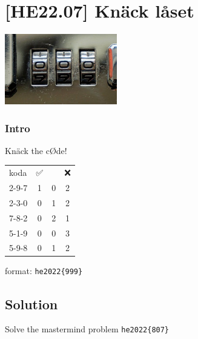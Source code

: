 
\hypertarget{he22.07}{%
\chapter{[HE22.07] Knäck låset}\label{he22.07}}

\begin{marginfigure}
	\includegraphics[width=49mm]{level3/challenge7.jpg}
\end{marginfigure}
\subsection{Intro}
Knäck the cØde!

\begin{tabular}{lccc}
	koda  & {\NotoEmoji ✅} &{\NotoEmoji 🔀}& {\NotoEmoji ❌} \\  
2-9-7  &1  &0  &2    \\
2-3-0  &0  &1  &2    \\
7-8-2  &0  &2  &1    \\
5-1-9  &0  &0 & 3    \\
5-9-8  &0  &1 & 2    \\
\end{tabular}

 format: \verb+he2022{999}+

\section{Solution}\label{hv21.07-solution}

Solve the mastermind problem \verb+he2022{807}+

